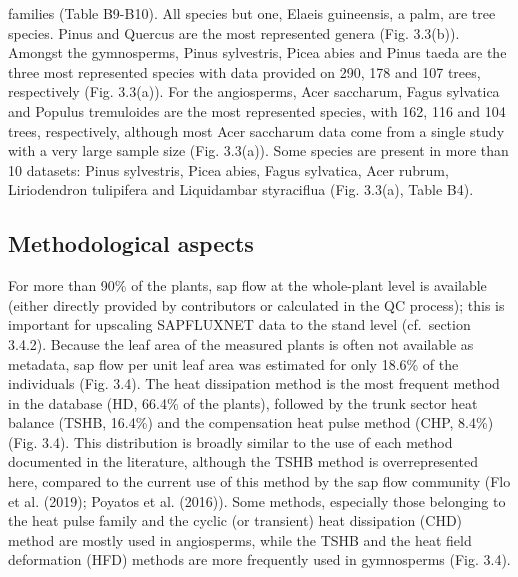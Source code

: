 \documentclass[11pt,twoside]{reedthesis}
\begin{document}
families (Table B9-B10). All species but one, Elaeis guineensis, a palm,
are tree species. Pinus and Quercus are the most represented genera
(Fig. 3.3(b)). Amongst the gymnosperms, Pinus sylvestris, Picea abies
and Pinus taeda are the three most represented species with data
provided on 290, 178 and 107 trees, respectively (Fig. 3.3(a)). For the
angiosperms, Acer saccharum, Fagus sylvatica and Populus tremuloides are
the most represented species, with 162, 116 and 104 trees, respectively,
although most Acer saccharum data come from a single study with a very
large sample size (Fig. 3.3(a)). Some species are present in more than
10 datasets: Pinus sylvestris, Picea abies, Fagus sylvatica, Acer
rubrum, Liriodendron tulipifera and Liquidambar styraciflua (Fig.
3.3(a), Table B4).\par

\subsection{Methodological aspects}\label{methodological-aspects}

For more than 90\% of the plants, sap flow at the whole-plant level is
available (either directly provided by contributors or calculated in the
QC process); this is important for upscaling SAPFLUXNET data to the
stand level (cf.~section 3.4.2). Because the leaf area of the measured
plants is often not available as metadata, sap flow per unit leaf area
was estimated for only 18.6\% of the individuals (Fig. 3.4). The heat
dissipation method is the most frequent method in the database (HD,
66.4\% of the plants), followed by the trunk sector heat balance (TSHB,
16.4\%) and the compensation heat pulse method (CHP, 8.4\%) (Fig. 3.4).
This distribution is broadly similar to the use of each method
documented in the literature, although the TSHB method is
overrepresented here, compared to the current use of this method by the
sap flow community (Flo et al. (2019); Poyatos et al. (2016)). Some
methods, especially those belonging to the heat pulse family and the
cyclic (or transient) heat dissipation (CHD) method are mostly used in
angiosperms, while the TSHB and the heat field deformation (HFD) methods
are more frequently used in gymnosperms (Fig. 3.4).\par
\end{document}
